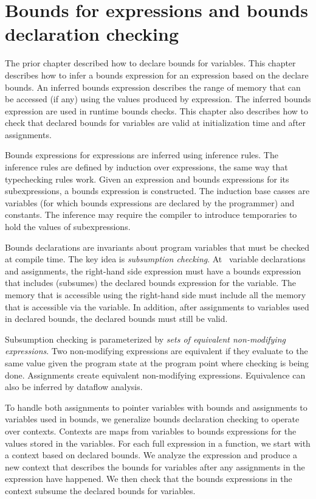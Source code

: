 
\chapter{Bounds for expressions and bounds declaration checking}
\label{chapter:checking-bounds}

The prior chapter described how to declare bounds for variables.
This chapter describes how to infer a bounds expression for 
an expression based on the declare bounds.  An inferred bounds expression
describes the range of memory that can be accessed (if any) using 
the values produced by expression.  The inferred bounds expression
are used in runtime bounds checks.   This chapter also describes how to
 check that  declared bounds for variables are valid at initialization
 time and after assignments.

Bounds expressions for expressions are inferred using inference
rules.  The inference rules are defined by induction over expressions, 
the same way that typechecking rules work.  Given an expression
and bounds expressions for its subexpressions, a bounds expression
is constructed.  The induction base casses are variables (for which
bounds expressions are declared by the programmer) and constants.
The inference may require the compiler to introduce temporaries to
hold the values of subexpressions.

Bounds declarations are invariants about program variables
that must be checked at compile time.  The key idea is {\em subsumption checking}.
At \arrayptr\ variable declarations and assignments, 
the right-hand side expression must have a bounds expression that includes (subsumes) 
the declared bounds  expression for the variable.  The memory that is accessible using
the right-hand side must include all the memory that is accessible via the variable.
In addition, after assignments to variables used in declared bounds, the
declared bounds must still be valid.

Subsumption checking is parameterized by {\it sets of equivalent non-modifying expressions}.
Two non-modifying expressions are equivalent if they
evaluate to the same value given the program state at the program point where 
checking is being done.  Assignments create equivalent non-modifying
expressions. Equivalence can also be inferred by dataflow analysis.

To handle both assignments to pointer variables with bounds and assignments
to variables used in bounds, we generalize bounds declaration
checking to operate over contexts.  Contexts are maps from variables
to bounds expressions for the values stored in the variables.  For
each full expression in a function, we start with a context based
on declared bounds.  We analyze the expression and produce a new
context that describes the bounds for variables after any assignments
in the expression have happened.  We then check that the bounds
expressions in the context subsume the declared bounds for variables.

